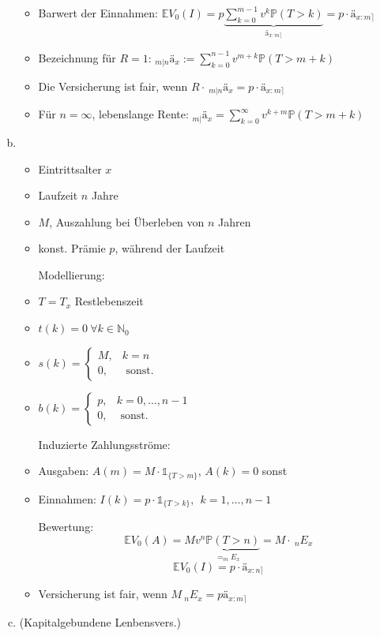 \begin{enumerate}[(a)]
\begin{itemize}
		\item Barwert der Einnahmen: $\mathds{E}V_0(I)=p\underbrace{\sum\limits_{k=0}^{m-1}v^k \mathds{P}(T>k)}_{ä_{x:m\rceil}}=p\cdot ä_{x:m\rceil}$
		\item Bezeichnung für $R=1$: $_{m|n}ä_x:=\sum\limits_{k=0}^{n-1}v^{m+k}\mathds{P}(T>m+k)$
		\item Die Versicherung ist fair, wenn $R\cdot~ _{m|n}ä_x=p\cdot ä_{x:m\rceil}$
		\item Für $n=\infty$, lebenslange Rente: $_{m|}ä_x=\sum\limits_{k=0}^{\infty}v^{k+m}\mathds{P}(T>m+k)$
	\end{itemize}
	\item {}\\
	\begin{itemize}
		\item Eintrittsalter $x$
		\item Laufzeit $n$ Jahre
		\item {} $M$, Auszahlung bei Überleben von $n$ Jahren
		\item konst. Prämie $p$, während der Laufzeit
		\item[Modellierung:]
		\item $T=T_x$ Restlebenszeit
		\item $t(k)=0~\forall k\in \mathds{N}_0$
		\item $s(k)=\left\{\begin{array}{cl} M, & k=n\\ 0, & \text{ sonst.} \end{array}\right.$
		\item $b(k)=\left\{\begin{array}{cl} p, & k=0,\dots,n-1 \\ 0, & \text{ sonst.}	\end{array}\right.$
		\item[Induzierte Zahlungsströme:]
		\item Ausgaben: $A(m)=M\cdot \mathbb{1}_{\{T>m\}}$, $A(k)=0$ sonst
		\item Einnahmen: $I(k)=p\cdot \mathbb{1}_{\{T>k\}},~~k=1,\dots,n-1$
		\item[Bewertung:]
		\[\mathds{E}V_0(A)= M \underbrace{v^n \mathds{P}(T>n)}_{= _mE_x}=M\cdot~_nE_x \]
		\[\mathds{E}V_0(I)= p\cdot ä_{x:n\rceil} \]
		\item Versicherung ist fair, wenn $ M~_nE_x=pä_{x:m\rceil}$
	\end{itemize}
	\item {} (Kapitalgebundene Lenbensvers.)\\
	

\end{enumerate}

